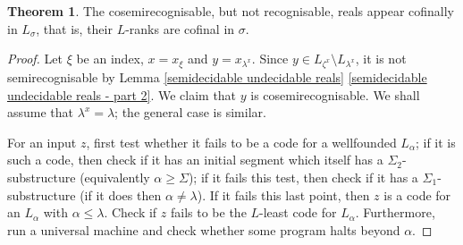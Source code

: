 \documentclass[a4paper,11pt]{amsart}
\theoremstyle{definition}
\newtheorem{theorem}[fact]{Theorem}
\newtheorem*{problem A}{Problem 1}
\newtheorem*{problem B}{Problem 2}
\newtheorem*{claim*}{Claim}
\theoremstyle{remark}
\begin{document}
\begin{theorem} 
The cosemirecognisable, but not recognisable, reals appear cofinally in $L_\sigma$, that is, their $L$-ranks are cofinal in $\sigma$.
\end{theorem} 
\begin{proof} 
Let $\xi$ be an index, $x=x_\xi$ and $y=x_{\lambda^x}$. 
Since $y\in L_{\zeta^x}\setminus L_{\lambda^x}$, it is not semirecognisable by Lemma \ref{semidecidable undecidable reals} \ref{semidecidable undecidable reals - part 2}. 
We claim that $y$ is cosemirecognisable. 
We shall assume that $\lambda^x=\lambda$; the general case is similar. 

For an input $z$, first test whether it fails to be a code for a wellfounded $L_\alpha$; if it is such a code, then check if it has an initial segment which itself has a $\Sigma_2$-substructure (equivalently $\alpha\geq \Sigma$); if it fails this test, then check if it has a $\Sigma_1$-substructure (if it does then $\alpha \neq \lambda$). 
If it fails this last point, then $z$ is a code for an $L_\alpha$ with $\alpha \leq \lambda$. 
Check if $z$ fails to be the $L$-least code for $L_\alpha$. 
Furthermore, run a universal machine and check whether some program halts beyond $\alpha$. 
\end{proof} 







\end{document}
